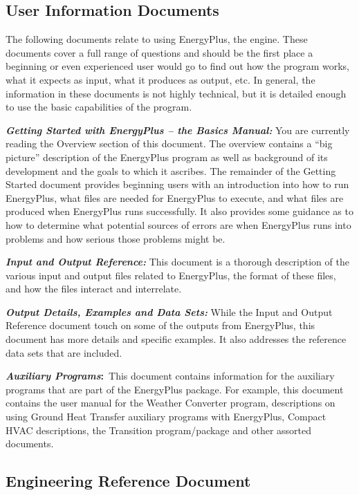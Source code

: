\subsection{User Information Documents}\label{user-information-documents}

The following documents relate to using EnergyPlus, the engine. These documents cover a full range of questions and should be the first place a beginning or even experienced user would go to find out how the program works, what it expects as input, what it produces as output, etc. In general, the information in these documents is not highly technical, but it is detailed enough to use the basic capabilities of the program.

\textbf{\emph{Getting Started with EnergyPlus -- the Basics Manual:}} You are currently reading the Overview section of this document. The overview contains a ``big picture'' description of the EnergyPlus program as well as background of its development and the goals to which it ascribes. The remainder of the Getting Started document provides beginning users with an introduction into how to run EnergyPlus, what files are needed for EnergyPlus to execute, and what files are produced when EnergyPlus runs successfully. It also provides some guidance as to how to determine what potential sources of errors are when EnergyPlus runs into problems and how serious those problems might be.

\textbf{\emph{Input and Output Reference:}} This document is a thorough description of the various input and output files related to EnergyPlus, the format of these files, and how the files interact and interrelate.

\textbf{\emph{Output Details, Examples and Data Sets:}} While the Input and Output Reference document touch on some of the outputs from EnergyPlus, this document has more details and specific examples. It also addresses the reference data sets that are included.

\textbf{\emph{Auxiliary Programs}:}~This document contains information for the auxiliary programs that are part of the EnergyPlus package. For example, this document contains the user manual for the Weather Converter program, descriptions on using Ground Heat Transfer auxiliary programs with EnergyPlus, Compact HVAC descriptions, the Transition program/package and other assorted documents.

\subsection{Engineering Reference Document}\label{engineering-reference-document}

